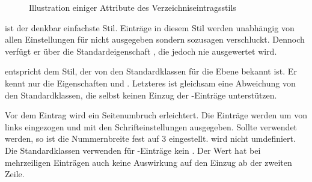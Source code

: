 \begin{description}
\begin{figure}
{%
    }
    \caption{Illustration einiger Attribute des Verzeichniseintragsstils
      }
    \label{fig:tocbasic.dottedtocline}
  \end{figure}
\item[\PValue{gobble}] ist der denkbar einfachste Stil. Einträge in diesem
  Stil werden unabhängig von allen Einstellungen für
  nicht ausgegeben sondern sozusagen verschluckt. Dennoch verfügt er über die
  Standardeigenschaft , die jedoch nie ausgewertet wird.
\item[\PValue{largetocline}] entspricht dem Stil, der von den Standardklassen
  für die Ebene  bekannt ist. Er kennt
  nur die Eigenschaften
   und . Letzteres ist gleichsam eine Abweichung
  von den Standardklassen, die selbst keinen Einzug der -Einträge
  unterstützen.

  Vor dem Eintrag wird ein Seitenumbruch erleichtert. Die Einträge werden um
   von links eingezogen und mit den Schrifteinstellungen
   ausgegeben. Sollte
   verwendet werden, so ist die
  Nummernbreite fest auf 3
  eingestellt.  wird nicht umdefiniert. Die
  Standardklassen verwenden für -Einträge kein
  . Der Wert hat bei mehrzeiligen Einträgen
  auch keine Auswirkung auf den Einzug ab der zweiten Zeile.


\end{description}

